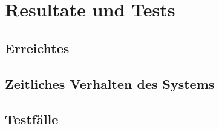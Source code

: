\section{Resultate und Tests}
\subsection{Erreichtes}
\subsection{Zeitliches Verhalten des Systems}
\subsection{Testfälle}